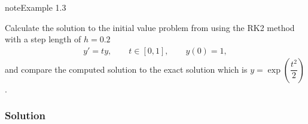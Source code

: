 \documentclass[letterpaper,10pt,english]{jupyterBook}
\begin{document}
\begin{sphinxadmonition}{note}{Example 1.3}

\sphinxAtStartPar
Calculate the solution to the initial value problem from {\hyperref[\detokenize{1_IVPs/1.2_Euler_Method:euler-example}]{}} using the RK2 method with a step length of \(h = 0.2\)
\begin{align*}
    y'=ty, \qquad t\in [0,1], \qquad y(0)=1,
\end{align*}
\sphinxAtStartPar
and compare the computed solution to the exact solution which is \(y = \exp\left(\dfrac{t^2}{2}\right)\).
\subsubsection*{Solution}


\end{sphinxadmonition}
\end{document}
